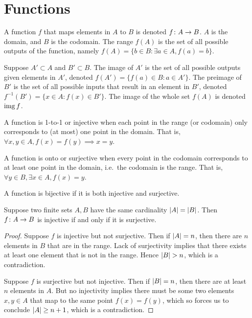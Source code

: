 \section{Functions}

\begin{definition}
    A function \(f\) that maps elements in \(A\) to \(B\)
    is denoted \(f\colon A\to B\).
    \(A\) is the domain, and \(B\) is the codomain.
    The range \(f(A)\) is the set of all possible outputs of the function,
    namely \(f(A) = \{b \in B : \exists a \in A, f(a) = b\}\).
\end{definition}

\begin{definition}
    Suppose \(A' \subset A\) and \(B' \subset B\).
    The image of \(A'\) is the set of all possible outputs
    given elements in \(A'\),
    denoted \(f(A') = \{f(a) \in B : a \in A'\}\).
    The preimage of \(B'\) is the set of all possible inputs
    that result in an element in \(B'\),
    denoted \(f^{-1}(B') = \{x \in A : f(x) \in B'\}\).
    The image of the whole set \(f(A)\) is denoted \(\operatorname{img} f\).
\end{definition}

\begin{definition}
    A function is 1-to-1 or injective
    when each point in the range (or codomain)
    only corresponds to (at most) one point in the domain.
    That is, \(\forall x,y \in A, f(x) = f(y) \implies x = y\).
\end{definition}
\begin{definition}
    A function is onto or surjective
    when every point in the codomain
    corresponds to at least one point in the domain,
    i.e.\ the codomain is the range.
    That is, \(\forall y \in B, \exists x \in A, f(x) = y\).
\end{definition}
\begin{definition}
    A function is bijective if it is both injective and surjective.
\end{definition}


\begin{theorem}\label{thm:pigeonhole}
    Suppose two finite sets \(A,B\) have the same cardinality
    \(\abs{A} = \abs{B}\).
    Then \(f\colon A\to B\) is injective
    if and only if it is surjective.
\end{theorem}
\begin{proof}
    Suppose \(f\) is injective but not surjective.
    Then if \(\abs{A} = n\),
    then there are \(n\) elements in \(B\) that are in the range.
    Lack of surjectivity implies that
    there exists at least one element that is not in the range.
    Hence \(\abs{B} > n\), which is a contradiction.

    Suppose \(f\) is surjective but not injective.
    Then if \(\abs{B} = n\),
    then there are at least \(n\) elements in \(A\).
    But no injectivity implies there must be some two elements
    \(x,y \in A\) that map to the same point \(f(x) = f(y)\),
    which so forces us to conclude \(\abs{A} \geq n+1\),
    which is a contradiction.
\end{proof}

